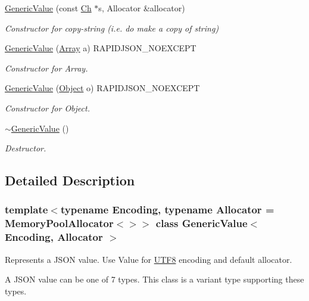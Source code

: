 \begin{DoxyCompactItemize}
\hyperlink{class_generic_value_a9b72b2e3347d4cd77b16c3b45e8decf1}{Generic\+Value} (const \hyperlink{class_generic_value_ade0e0ce64ccd5d852da57a35e720bafb}{Ch} $\ast$s, Allocator \&allocator)
\begin{DoxyCompactList}\small\item\em Constructor for copy-\/string (i.\+e. do make a copy of string) \end{DoxyCompactList}\item 
\hyperlink{class_generic_value_a953052ef91e54aabe9bdb9f9eaebf6cc}{Generic\+Value} (\hyperlink{class_generic_array}{Array} a) R\+A\+P\+I\+D\+J\+S\+O\+N\+\_\+\+N\+O\+E\+X\+C\+E\+PT
\begin{DoxyCompactList}\small\item\em Constructor for Array. \end{DoxyCompactList}\item 
\hyperlink{class_generic_value_a9c294e56f4ab940f845f7c171b183483}{Generic\+Value} (\hyperlink{class_generic_object}{Object} o) R\+A\+P\+I\+D\+J\+S\+O\+N\+\_\+\+N\+O\+E\+X\+C\+E\+PT
\begin{DoxyCompactList}\small\item\em Constructor for Object. \end{DoxyCompactList}\item 
\hyperlink{class_generic_value_a213ba89ef5ef961a5e655bd8c78ac9f4}{$\sim$\+Generic\+Value} ()
\begin{DoxyCompactList}\small\item\em Destructor. \end{DoxyCompactList}\end{DoxyCompactItemize}


\subsection{Detailed Description}
\subsubsection*{template$<$typename Encoding, typename Allocator = Memory\+Pool\+Allocator$<$$>$$>$\newline
class Generic\+Value$<$ Encoding, Allocator $>$}

Represents a J\+S\+ON value. Use Value for \hyperlink{struct_u_t_f8}{U\+T\+F8} encoding and default allocator. 

A J\+S\+ON value can be one of 7 types. This class is a variant type supporting these types.

